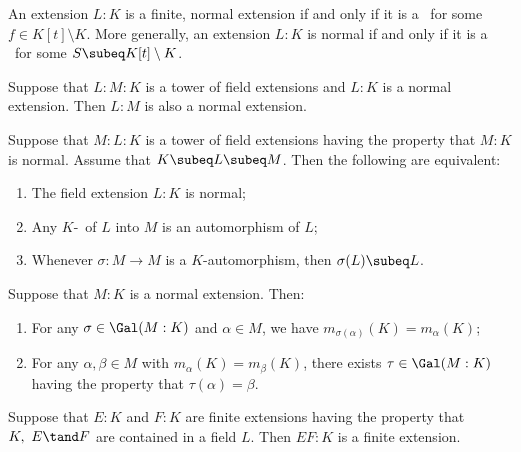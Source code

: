 \documentclass{article}
\begin{document}
  \begin{tproposition}
    An extension \( L:K \) is a finite, normal extension if and only if it is a \sfe~for some \( f\in K[t]\setminus K \). More generally, an extension \( L:K \) is normal if and only if it is a \sfe~for some \( S\subeq K[t]\setminus K \).
  \end{tproposition}

  \begin{tproposition}
    Suppose that \( L:M:K \) is a tower of field extensions and \( L:K \) is a normal extension. Then \( L:M \) is also a normal extension.
  \end{tproposition}

  \begin{ttheorem}
    Suppose that \( M:L:K \) is a tower of field extensions having the property that \( M:K \) is normal. Assume that \( K\subeq L\subeq M \). Then the following are equivalent:
    \begin{enumerate}[label=(\roman*)]
      \item The field extension \( L:K \) is normal;
      \item Any \( K \)-\homo~of \( L \) into \( M \) is an automorphism of \( L \);
      \item Whenever \( \sigma:M\to M \) is a \( K \)-automorphism, then \( \sigma(L)\subeq L \).
    \end{enumerate}
  \end{ttheorem}

  \begin{tproposition}
    Suppose that \( M:K \) is a normal extension. Then:
    \begin{enumerate}[label=(\alph*)]
      \item For any \( \sigma\in\Gal(M:K) \) and \( \alpha\in M \), we have \( m_{\sigma(\alpha)}(K)=m_\alpha(K) \);
      \item For any \( \alpha,\beta\in M \) with \( m_\alpha(K)=m_\beta(K) \), there exists \( \tau\in\Gal(M:K) \) having the property that \( \tau(\alpha)=\beta \).
    \end{enumerate}
  \end{tproposition}

  \begin{tproposition}
    Suppose that \( E:K \) and \( F:K \) are finite extensions having the property that \( K,\ E\tand F \) are contained in a field \( L \). Then \( EF:K \) is a finite extension.
  \end{tproposition}
\end{document}
